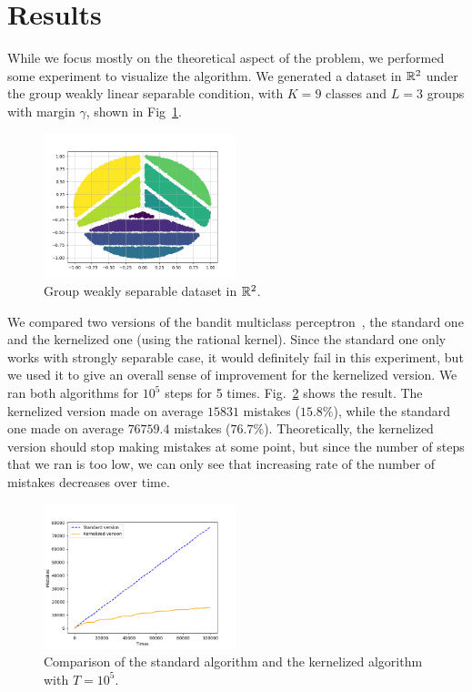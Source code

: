 \justify


\section{Results}
While we focus mostly on the theoretical aspect of the problem, we
performed some experiment to visualize the algorithm.
We generated a dataset in ${\mathbb{R}}^2$ under the group weakly linear separable
condition, with $K=9$ classes and $L=3$ groups with margin $\gamma$,
shown in Fig~\ref{fig:data}.

\begin{figure}[hbt!]
\centering
\includegraphics[width=0.5\textwidth]{weakly.png}
\caption{Group weakly separable dataset in ${\mathbb{R}}^2$.}
\label{fig:data}
\end{figure}

We compared two versions of the bandit multiclass perceptron~\cite{BeygelzimerPSTWZ2019-separable},
the standard one and the kernelized one (using the rational kernel).  Since the standard one only works with strongly separable case, it would definitely fail in this experiment, but we used it to give an overall sense of improvement for the kernelized version.  We ran both algorithms for $10^5$ steps for 5 times.  Fig.~\ref{fig:result} shows the result.  The kernelized version made on average $15831$ mistakes ($15.8\%$), while the standard one made on average $76759.4$ mistakes ($76.7\%$).  Theoretically, the kernelized version should stop making mistakes at some point, but since the number of steps that we ran is too low, we can only see that increasing rate of the number of mistakes decreases over time.

\begin{figure}[hbt!]
\centering
\includegraphics[width=0.5\textwidth]{result.png}
\caption{
Comparison of the standard algorithm and the kernelized algorithm with $T=10^5$.  
}
\label{fig:result}
\end{figure}


